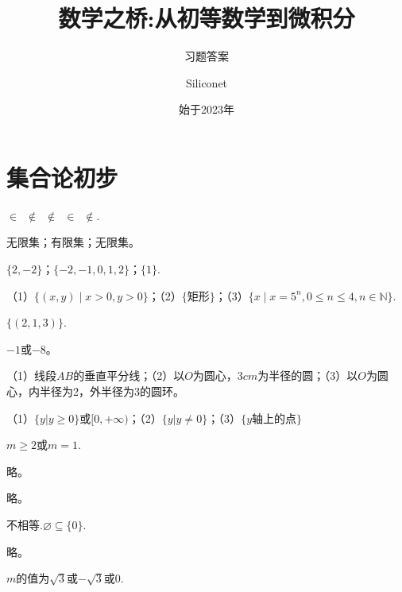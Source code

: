 \documentclass[lang=cn,newtx,10pt,scheme=chinese]{elegantbook}
\title{数学之桥:从初等数学到微积分}
\subtitle{习题答案}
\author{Siliconet}
\date{始于2023年}
\begin{document}
\maketitle
\frontmatter

\tableofcontents

\mainmatter

\chapter{集合论初步}
\begin{exercise}
  $\in\enspace\notin\enspace\notin\enspace\in\enspace\notin$.
\end{exercise}
\begin{exercise}
  无限集；有限集；无限集。
\end{exercise}
\begin{exercise}
  $\{2,-2\}$；$\{-2,-1,0,1,2\}$；$\{1\}$.
\end{exercise}
\begin{exercise}
  （1）$\{(x,y)\mid x>0,y>0\}$；（2）$\{\text{矩形}\}$；（3）$\{x\mid x=5^n,0\leq n\leq 4,n\in\mathbb{N}\}$.
\end{exercise}
\begin{exercise}
  $\{(2,1,3)\}$.
\end{exercise}
\begin{exercise}
  $-1$或$-8$。
\end{exercise}
\begin{exercise}
  （1）线段$AB$的垂直平分线；（2）以$O$为圆心，$3cm$为半径的圆；（3）以$O$为圆心，内半径为2，外半径为3的圆环。
\end{exercise}
\begin{exercise}
  （1）$\{y|y\geqslant0\}$或$[0,+\infty)$；（2）$\{y|y\neq0\}$；（3）$\{y\text{轴上的点}\}$
\end{exercise}
\begin{exercise}
  $m\geqslant2\text{或}m=1$.
\end{exercise}
\begin{exercise}
  略。
\end{exercise}
\begin{exercise}
  略。
\end{exercise}
\begin{exercise}
  不相等.$\varnothing\subseteq\{0\}.$
\end{exercise}
\begin{exercise}
  略。
\end{exercise}
\begin{exercise}
  $m$的值为$\sqrt{3}$或$-\sqrt{3}$或$0$.
\end{exercise}
\end{document}
